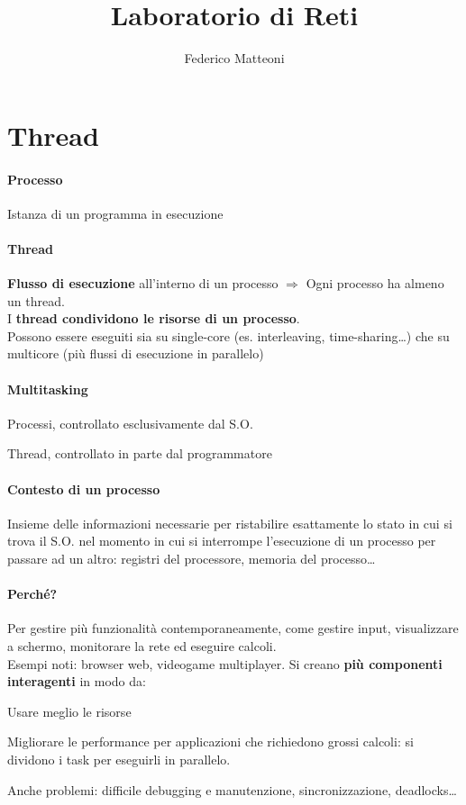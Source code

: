 \documentclass[10pt]{article}
\begin{document}
\title{Laboratorio di Reti}
\author{Federico Matteoni}
\date{ }
\renewcommand*\contentsname{Indice}

\maketitle
\section{Thread}
\paragraph{Processo} Istanza di un programma in esecuzione
\paragraph{Thread} \textbf{Flusso di esecuzione} all'interno di un processo $\Rightarrow$ Ogni processo ha almeno un thread.\\I \textbf{thread condividono le risorse di un processo}.\\
Possono essere eseguiti sia su single-core (es. interleaving, time-sharing\ldots) che su multicore (più flussi di esecuzione in parallelo)
\paragraph{Multitasking} \begin{list}{}{Si può riferire a}
	\item Processi, controllato esclusivamente dal S.O.
	\item Thread, controllato in parte dal programmatore
\end{list}
\paragraph{Contesto di un processo} Insieme delle informazioni necessarie per ristabilire esattamente lo stato in cui si trova il S.O. nel momento in cui si interrompe l'esecuzione di un processo per passare ad un altro: registri del processore, memoria del processo\ldots
\paragraph{Perché?} Per gestire più funzionalità contemporaneamente, come gestire input, visualizzare a schermo, monitorare la rete ed eseguire calcoli.\\
Esempi noti: browser web, videogame multiplayer. Si creano \textbf{più componenti interagenti} in modo da:\begin{list}{}{}
	\item Usare meglio le risorse
	\item Migliorare le performance per applicazioni che richiedono grossi calcoli: si dividono i task per eseguirli in parallelo.
	\item Anche problemi: difficile debugging e manutenzione, sincronizzazione, deadlocks\ldots
\end{list}
\end{document}
